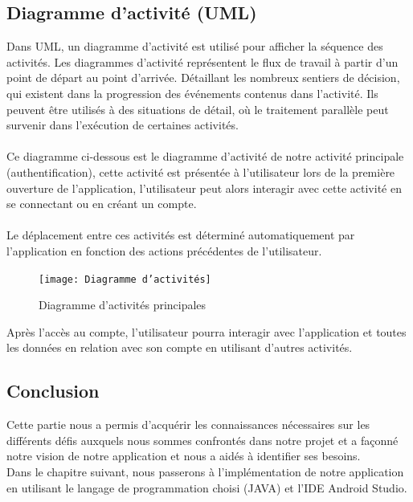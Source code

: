 \documentclass[french]{report}
\begin{document}
\begin{titlepage}
\subsection{\LARGE Diagramme d'activité (UML)}
\LARGE Dans UML, un diagramme d’activité est utilisé pour afficher la séquence des activités. Les diagrammes d’activité représentent le flux de travail à partir d’un point de départ au point d’arrivée. Détaillant les nombreux sentiers de décision, qui existent dans la progression des événements contenus dans l’activité. Ils peuvent être utilisés à des situations de détail, où le traitement parallèle peut survenir dans l’exécution de certaines activités.\\\\
Ce diagramme ci-dessous est le diagramme d'activité de notre activité principale (authentification), cette activité est présentée à l'utilisateur lors de la première ouverture de l'application, l'utilisateur peut alors interagir avec cette activité en se connectant ou en créant un compte.\\\\
Le déplacement entre ces activités est déterminé automatiquement par l'application en fonction des actions précédentes de l'utilisateur.
\begin{figure}[H]
    \centering
    \texttt{[image: Diagramme d'activités]}
    \caption{Diagramme d'activités principales}
    \label{fig:activity}
\end{figure}
Après l'accès au compte, l'utilisateur pourra interagir avec l'application et toutes les données en relation avec son compte en utilisant d'autres activités.
\subsection{\LARGE Conclusion}
\LARGE Cette partie nous a permis d'acquérir les connaissances nécessaires sur les différents défis auxquels nous sommes confrontés dans notre projet et a façonné notre vision de notre application et nous a aidés à identifier ses besoins.\\
Dans le chapitre suivant, nous passerons à l'implémentation de notre application en utilisant le langage de programmation choisi (JAVA) et l'IDE Android Studio.
\printindex
\newpage
\end{titlepage}
\end{document}
